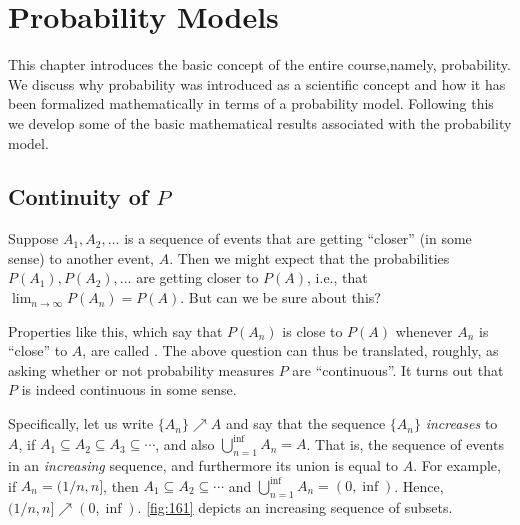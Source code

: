 \chapter{Probability Models}\label{chap:probability_models}
\minitoc
This chapter introduces the basic concept of the entire course,\linebreak[2] namely, probability. We discuss why probability was introduced as a scientific concept and how it has been formalized mathematically in terms of a probability model. Following this we develop some of the basic mathematical results associated with the probability model.







\section{Continuity of $P$}
Suppose $A_1, A_2, \ldots$ is a sequence of events that are getting ``closer'' (in some sense) to another event, $A$. Then we might expect that the probabilities $P(A_1), P(A_2), \ldots$ are getting closer to $P(A)$, i.e., that $\lim_{n\to\infty}P(A_n)=P(A)$. But can we be sure about this?

Properties like this, which say that $P(A_n)$ is close to $P(A)$ whenever $A_n$ is ``close'' to $A$, are called . The above question can thus be translated, roughly, as asking whether or not probability measures $P$ are ``continuous''. It turns out that $P$ is indeed continuous in some sense.

Specifically, let us write $\{A_n\} \nearrow A$ and say that the sequence $\{A_n\}$ \emph{increases} to $A$, if $A_1 \subseteq A_2 \subseteq A_3 \subseteq \cdots$, and also $\bigcup^{\inf}_{n=1} A_n=A$. That is, the sequence of events in an \emph{increasing} sequence, and furthermore its union is equal to $A$. For example, if $A_n=(1/n,n]$, then $A_1 \subseteq A_2\subseteq\cdots$ and $\bigcup_{n=1}^{\inf}A_n=(0,\inf)$. Hence, ${(1/n,n]}\nearrow(0,\inf)$. \autoref{fig:161} depicts an increasing sequence of subsets.

